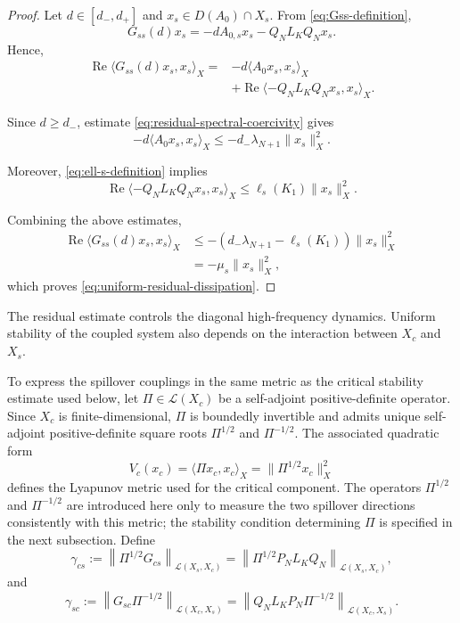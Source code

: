 \documentclass[pdflatex,sn-mathphys-num]{sn-jnl}
\theoremstyle{thmstyleone}%
\theoremstyle{thmstyletwo}%
\theoremstyle{thmstylethree}%
\begin{document}
\begin{proof}

Let \(d\in[d_-,d_+]\) and
\(x_s\in D(A_0)\cap X_s\).
From \eqref{eq:Gss-definition},
\[
G_{ss}(d)x_s
=
-dA_{0,s}x_s
-
Q_NL_KQ_Nx_s.
\]
Hence,
\[
\begin{aligned}
\operatorname{Re}
\langle
G_{ss}(d)x_s,x_s
\rangle_X
={}&
-d
\langle
A_0x_s,x_s
\rangle_X
\\
&+
\operatorname{Re}
\langle
-Q_NL_KQ_Nx_s,x_s
\rangle_X.
\end{aligned}
\]

Since \(d\ge d_-\), estimate
\eqref{eq:residual-spectral-coercivity} gives
\[
-d
\langle
A_0x_s,x_s
\rangle_X
\le
-d_-\lambda_{N+1}
\|x_s\|_X^2.
\]

Moreover, \eqref{eq:ell-s-definition} implies
\[
\operatorname{Re}
\langle
-Q_NL_KQ_Nx_s,x_s
\rangle_X
\le
\ell_s(K_1)
\|x_s\|_X^2.
\]

Combining the above estimates,
\[
\begin{aligned}
\operatorname{Re}
\langle
G_{ss}(d)x_s,x_s
\rangle_X
&\le
-
\left(
d_-\lambda_{N+1}
-
\ell_s(K_1)
\right)
\|x_s\|_X^2
\\
&=
-\mu_s\|x_s\|_X^2,
\end{aligned}
\]
which proves \eqref{eq:uniform-residual-dissipation}.

\end{proof}

The residual estimate controls the diagonal high-frequency dynamics.
Uniform stability of the coupled system also depends on the interaction between \(X_c\) and \(X_s\).

 
To express the spillover couplings in the same metric as the critical stability estimate used below, let \(\Pi\in\mathcal L(X_c)\) be a self-adjoint positive-definite operator.
Since \(X_c\) is finite-dimensional, \(\Pi\) is boundedly invertible and admits unique self-adjoint positive-definite square roots \(\Pi^{1/2}\) and \(\Pi^{-1/2}\). The associated quadratic form
\[
V_c(x_c)
=
\langle \Pi x_c,x_c\rangle_X
=
\|\Pi^{1/2}x_c\|_X^2
\]
defines the Lyapunov metric used for the critical component. The operators \(\Pi^{1/2}\) and \(\Pi^{-1/2}\) are introduced here only to measure the two spillover directions consistently with this metric; the stability condition determining \(\Pi\) is specified in the next subsection.
Define
\begin{equation}
\gamma_{cs}
:=
\left\|
\Pi^{1/2}G_{cs}
\right\|_{\mathcal L(X_s,X_c)}
=
\left\|
\Pi^{1/2}P_NL_KQ_N
\right\|_{\mathcal L(X_s,X_c)},
\label{eq:weighted-gamma-cs}
\end{equation}
and
\begin{equation}
\gamma_{sc}
:=
\left\|
G_{sc}\Pi^{-1/2}
\right\|_{\mathcal L(X_c,X_s)}
=
\left\|
Q_NL_KP_N\Pi^{-1/2}
\right\|_{\mathcal L(X_c,X_s)}.
\label{eq:weighted-gamma-sc}
\end{equation}
\end{document}
